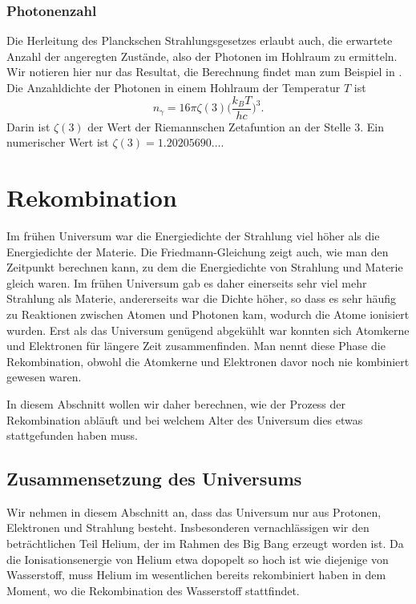 \subsubsection{Photonenzahl}
Die Herleitung des Planckschen Strahlungsgesetzes erlaubt auch, die
erwartete Anzahl der angeregten Zustände, also der Photonen im
Hohlraum zu ermitteln.
Wir notieren hier nur das Resultat, die Berechnung findet man zum
Beispiel in \cite[Abschnitt 1.9]{skript:feynman}.
Die Anzahldichte der Photonen in einem Hohlraum der Temperatur $T$ ist
\begin{equation}
n_\gamma
=
16\pi\zeta(3)
\biggl(\frac{k_BT}{hc}\biggr)^3.
\label{skript:cmb:photonenzahl}
\end{equation}
Darin ist $\zeta(3)$ der Wert der Riemannschen Zetafuntion an der
Stelle $3$.
Ein numerischer Wert ist $\zeta(3)=1.20205690\dots$.

\section{Rekombination%
\label{skript:cmb:section:rekombination}}
Im frühen Universum war die Energiedichte der Strahlung viel höher
als die Energiedichte der Materie.
Die Friedmann-Gleichung zeigt auch, wie man den Zeitpunkt berechnen
kann, zu dem die Energiedichte von Strahlung und Materie gleich
waren.
Im frühen Universum gab es daher einerseits sehr viel mehr Strahlung
als Materie, andererseits war die Dichte höher, so dass es sehr
häufig zu Reaktionen zwischen Atomen und Photonen kam, wodurch die
Atome ionisiert wurden.
Erst als das Universum genügend abgekühlt war konnten sich Atomkerne
und Elektronen für längere Zeit zusammenfinden.
Man nennt diese Phase die Rekombination, obwohl die Atomkerne und
Elektronen davor noch nie kombiniert gewesen waren.

In diesem Abschnitt wollen wir daher berechnen, wie der Prozess der
Rekombination abläuft und bei welchem Alter des Universum dies
etwas stattgefunden haben muss.

\subsection{Zusammensetzung des Universums}
Wir nehmen in diesem Abschnitt an, dass das Universum nur aus 
Protonen, Elektronen und Strahlung besteht.
Insbesonderen vernachlässigen wir den beträchtlichen Teil
Helium, der im Rahmen des Big Bang erzeugt worden ist.
Da die Ionisationsenergie von Helium etwa dopopelt so hoch ist wie
diejenige von Wasserstoff, muss Helium im wesentlichen bereits
rekombiniert haben in dem Moment, wo die Rekombination des Wasserstoff
stattfindet.

